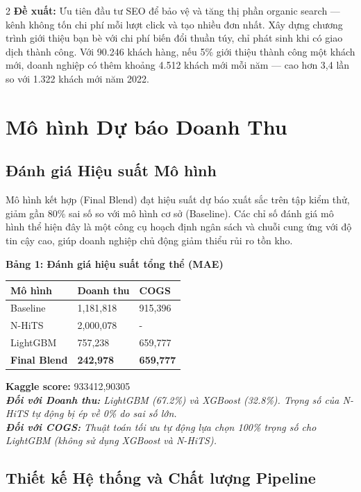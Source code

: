 \documentclass{article}
\begin{document}
\begin{multicols}{2}
\textbf{Đề xuất:} Ưu tiên đầu tư SEO để bảo vệ và tăng thị phần organic search — kênh không tốn chi phí mỗi lượt click và tạo nhiều đơn nhất. Xây dựng chương trình giới thiệu bạn bè với chi phí biến đổi thuần túy, chỉ phát sinh khi có giao dịch thành công. Với 90.246 khách hàng, nếu 5\% giới thiệu thành công một khách mới, doanh nghiệp có thêm khoảng 4.512 khách mới mỗi năm — cao hơn 3,4 lần so với 1.322 khách mới năm 2022.

\section{Mô hình Dự báo Doanh Thu}

\subsection{Đánh giá Hiệu suất Mô hình}

Mô hình kết hợp (Final Blend) đạt hiệu suất dự báo xuất sắc trên tập kiểm thử, giảm gần 80\% sai số so với mô hình cơ sở (Baseline). Các chỉ số đánh giá mô hình thể hiện đây là một công cụ hoạch định ngân sách và chuỗi cung ứng với độ tin cậy cao, giúp doanh nghiệp chủ động giảm thiểu rủi ro tồn kho.

\begin{center}
\small
\textbf{Bảng 1: Đánh giá hiệu suất tổng thể (MAE)} \\
\vspace{0.1cm}
\begin{tabularx}{\linewidth}{lXX}
\toprule
\textbf{Mô hình} & \textbf{Doanh thu} & \textbf{COGS} \\
\midrule
Baseline & 1,181,818 & 915,396 \\
N-HiTS & 2,000,078 & - \\
LightGBM & 757,238 & 659,777 \\
\textbf{Final Blend} & \textbf{242,978} & \textbf{659,777} \\
\bottomrule
\end{tabularx}
\end{center}
\textbf{Kaggle score:} 933412,90305\\
\textit{
\textbf{Đối với Doanh thu:} LightGBM (67.2\%) và XGBoost (32.8\%). Trọng số của N-HiTS tự động bị ép về 0\% do sai số lớn. \\
\textbf{Đối với COGS:} Thuật toán tối ưu tự động lựa chọn 100\% trọng số cho LightGBM (không sử dụng XGBoost và N-HiTS).
}

\subsection{Thiết kế Hệ thống và Chất lượng Pipeline}


\end{multicols}
\end{document}
